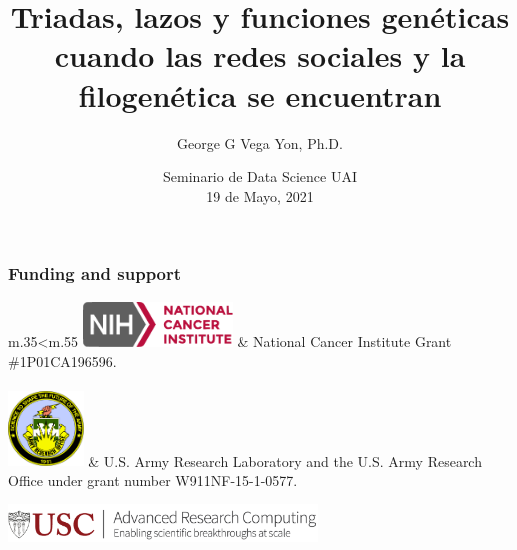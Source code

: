 \documentclass[aspectratio=169, 9pt]{beamer}
\title[SNA + Phylogenetics]{%
Triadas, lazos y funciones genéticas\\cuando las redes sociales y la filogenética se encuentran
}
\author[GGVY -- \href{vegayon@usc.edu}{vegayon@usc.edu}]{George G Vega Yon, Ph.D.}
\institute[USC-PREVMED]{University of Southern California, Department of Preventive Medicine}
\date{Seminario de Data Science UAI\\19 de Mayo, 2021}
\begin{document}
\begin{frame}%
\maketitle
\vspace{-.5cm}
%
\end{frame}


\begin{frame}[c]
	\frametitle{Funding and support}
	\begin{tabular}{m{.35\linewidth}<\centering m{.55\linewidth}}
	\includegraphics[height=1.2cm]{nci-logo.pdf} & National Cancer Institute Grant \#1P01CA196596.\\ \\
	\includegraphics[height=2cm]{aro-logo.png} & U.S. Army Research Laboratory and the U.S. Army Research Office under grant number W911NF-15-1-0577.
	\end{tabular}
	
	\vfill
	
	\begin{center}
	\includegraphics[height=1cm]{carc-logo.png}%
	\end{center}

\end{frame}
\end{document}
